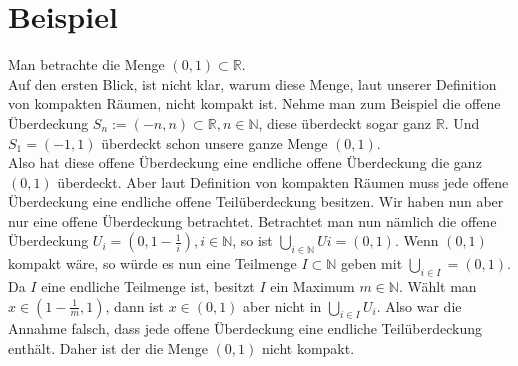 \section{Beispiel}
Man betrachte die Menge \( (0,1) \subset \mathbb{R} \).\\ Auf den ersten Blick, ist nicht klar, warum diese Menge, laut unserer Definition von kompakten Räumen, nicht kompakt ist. 
Nehme man zum Beispiel die offene Überdeckung \( S_{n} := (-n,n) \subset \mathbb{R} , n \in \mathbb{N} \), diese überdeckt sogar ganz \(  \mathbb{R} \). 
Und \( S_{1} = (-1,1)  \) überdeckt schon unsere ganze Menge \( (0,1) \). \\
Also hat diese offene Überdeckung eine endliche offene Überdeckung die ganz \( (0,1)\) überdeckt.
Aber laut Definition von kompakten Räumen muss jede offene Überdeckung eine endliche offene Teilüberdeckung besitzen. Wir haben nun aber nur eine offene Überdeckung betrachtet. Betrachtet man nun nämlich die offene Überdeckung \( U_{i}=(0,1-\frac{1}{i}), i \in \mathbb{N} \), so ist \(\bigcup_{i \in \mathbb{N}} U{i} = (0,1) \). Wenn \( (0,1)  \) kompakt wäre, 
so würde es nun eine Teilmenge \(I \subset \mathbb{N} \) geben mit \(\bigcup_{i \in I} = (0,1) \).
Da \(I\) eine endliche Teilmenge ist, besitzt \(I\) ein Maximum \( m \in \mathbb{N} \). Wählt man \(x \in (1-\frac{1}{m},1) \), dann ist \(x \in (0,1) \) aber nicht in 
\(\bigcup_{i \in I} U_{i}\). Also war die Annahme falsch, dass jede offene Überdeckung eine endliche Teilüberdeckung enthält. Daher ist der die Menge \((0,1) \) nicht kompakt.
		
